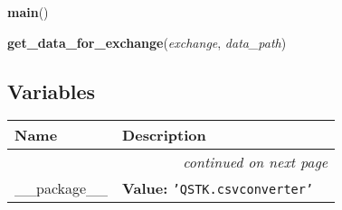     \vspace{0.5ex}

\hspace{.8\funcindent}\begin{boxedminipage}{\funcwidth}

    \raggedright \textbf{main}()

\setlength{\parskip}{2ex}
\setlength{\parskip}{1ex}
    \end{boxedminipage}

    \label{QSTK:csvconverter:yahoo_data_getter:get_data_for_exchange}

    \vspace{0.5ex}

\hspace{.8\funcindent}\begin{boxedminipage}{\funcwidth}

    \raggedright \textbf{get\_data\_for\_exchange}(\textit{exchange}, \textit{data\_path})

\setlength{\parskip}{2ex}
\setlength{\parskip}{1ex}
    \end{boxedminipage}



  \subsection{Variables}

    \vspace{-1cm}
\hspace{\varindent}\begin{longtable}{|p{\varnamewidth}|p{\vardescrwidth}|l}
\cline{1-2}
\cline{1-2} \centering \textbf{Name} & \centering \textbf{Description}& \\
\cline{1-2}
\endhead\cline{1-2}\multicolumn{3}{r}{\small\textit{continued on next page}}\\\endfoot\cline{1-2}
\endlastfoot\raggedright \_\-\_\-p\-a\-c\-k\-a\-g\-e\-\_\-\_\- & \raggedright \textbf{Value:} 
{\tt \texttt{'}\texttt{QSTK.csvconverter}\texttt{'}}&\\
\cline{1-2}
\end{longtable}

